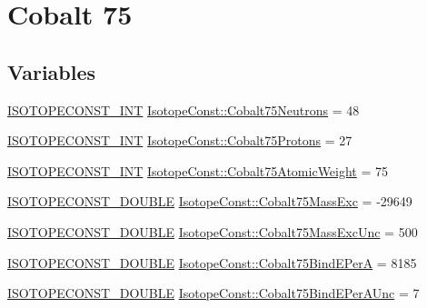 \hypertarget{group___isotope_const-_cobalt-_co75}{}\section{Cobalt 75}
\label{group___isotope_const-_cobalt-_co75}
\subsection*{Variables}
\begin{DoxyCompactItemize}
\item 
\mbox{\hyperlink{group___isotope_const-_macros_ga5f18360b3e99483a35c32d789e62621c}{I\+S\+O\+T\+O\+P\+E\+C\+O\+N\+S\+T\+\_\+\+I\+NT}} \mbox{\hyperlink{group___isotope_const-_cobalt-_co75_ga1c6d3fbb58693e3a82e21b3ef05ab19c}{Isotope\+Const\+::\+Cobalt75\+Neutrons}} = 48
\item 
\mbox{\hyperlink{group___isotope_const-_macros_ga5f18360b3e99483a35c32d789e62621c}{I\+S\+O\+T\+O\+P\+E\+C\+O\+N\+S\+T\+\_\+\+I\+NT}} \mbox{\hyperlink{group___isotope_const-_cobalt-_co75_ga30b5a92b59a27b540ed3b08f3eaf93f5}{Isotope\+Const\+::\+Cobalt75\+Protons}} = 27
\item 
\mbox{\hyperlink{group___isotope_const-_macros_ga5f18360b3e99483a35c32d789e62621c}{I\+S\+O\+T\+O\+P\+E\+C\+O\+N\+S\+T\+\_\+\+I\+NT}} \mbox{\hyperlink{group___isotope_const-_cobalt-_co75_ga9331dcfd087f6d15fc5f4c8b1ffca2f6}{Isotope\+Const\+::\+Cobalt75\+Atomic\+Weight}} = 75
\item 
\mbox{\hyperlink{group___isotope_const-_macros_ga8f45a7272ce02c0b4c65c44636ed719a}{I\+S\+O\+T\+O\+P\+E\+C\+O\+N\+S\+T\+\_\+\+D\+O\+U\+B\+LE}} \mbox{\hyperlink{group___isotope_const-_cobalt-_co75_ga375728bf8e9d2c1c0f57347d2ba2bce0}{Isotope\+Const\+::\+Cobalt75\+Mass\+Exc}} = -\/29649
\item 
\mbox{\hyperlink{group___isotope_const-_macros_ga8f45a7272ce02c0b4c65c44636ed719a}{I\+S\+O\+T\+O\+P\+E\+C\+O\+N\+S\+T\+\_\+\+D\+O\+U\+B\+LE}} \mbox{\hyperlink{group___isotope_const-_cobalt-_co75_gad4e162263a7ac383a44ffe83af5386a3}{Isotope\+Const\+::\+Cobalt75\+Mass\+Exc\+Unc}} = 500
\item 
\mbox{\hyperlink{group___isotope_const-_macros_ga8f45a7272ce02c0b4c65c44636ed719a}{I\+S\+O\+T\+O\+P\+E\+C\+O\+N\+S\+T\+\_\+\+D\+O\+U\+B\+LE}} \mbox{\hyperlink{group___isotope_const-_cobalt-_co75_gab35d2fd7229913c5aafa5cdcc346d636}{Isotope\+Const\+::\+Cobalt75\+Bind\+E\+PerA}} = 8185
\item 
\mbox{\hyperlink{group___isotope_const-_macros_ga8f45a7272ce02c0b4c65c44636ed719a}{I\+S\+O\+T\+O\+P\+E\+C\+O\+N\+S\+T\+\_\+\+D\+O\+U\+B\+LE}} \mbox{\hyperlink{group___isotope_const-_cobalt-_co75_gaad1aa030f696b090eaf97079f2bc37aa}{Isotope\+Const\+::\+Cobalt75\+Bind\+E\+Per\+A\+Unc}} = 7

\end{DoxyCompactItemize}
